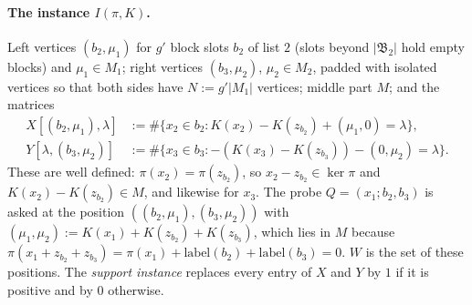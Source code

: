 \documentclass[11pt]{article}
\theoremstyle{definition}
\theoremstyle{remark}
\begin{document}
\paragraph{The instance $I(\pi,K)$.} Left vertices $(b_2,\mu_1)$ for $g'$ block slots $b_2$ of list $2$ (slots beyond $|\mathfrak B_2|$ hold empty blocks) and $\mu_1\in M_1$; right vertices $(b_3,\mu_2)$, $\mu_2\in M_2$, padded with isolated vertices so that both sides have $N:=g'|M_1|$ vertices; middle part $M$; and the matrices
\begin{align*}
X[(b_2,\mu_1),\lambda]&:=\#\{x_2\in b_2:K(x_2)-K(z_{b_2})+(\mu_1,0)=\lambda\},\\
Y[\lambda,(b_3,\mu_2)]&:=\#\{x_3\in b_3:-(K(x_3)-K(z_{b_3}))-(0,\mu_2)=\lambda\}.
\end{align*}
These are well defined: $\pi(x_2)=\pi(z_{b_2})$, so $x_2-z_{b_2}\in\ker\pi$ and $K(x_2)-K(z_{b_2})\in M$, and likewise for $x_3$. The probe $Q=(x_1;b_2,b_3)$ is asked at the position $((b_2,\mu_1),(b_3,\mu_2))$ with $(\mu_1,\mu_2):=K(x_1)+K(z_{b_2})+K(z_{b_3})$, which lies in $M$ because $\pi(x_1+z_{b_2}+z_{b_3})=\pi(x_1)+\mathrm{label}(b_2)+\mathrm{label}(b_3)=0$. $W$ is the set of these positions. The \emph{support instance} replaces every entry of $X$ and $Y$ by $1$ if it is positive and by $0$ otherwise.
\end{document}
